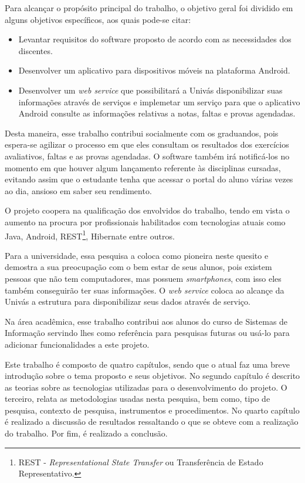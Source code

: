 	\par Para alcançar o propósito principal do trabalho, o objetivo geral foi
dividido em alguns objetivos específicos, aos quais pode-se citar:
	
	\begin{itemize}
	  
	  \item Levantar requisitos do software proposto de acordo com as
	  necessidades dos discentes.
	  
	  \item Desenvolver um aplicativo para dispositivos móveis na plataforma
	  Android.
	  
	  \item Desenvolver um \textit{web service} que possibilitará a Univás
	  disponibilizar suas informações através de serviços e implemetar um serviço
	  para que o aplicativo Android consulte as informações  relativas a notas,
	  faltas e provas agendadas.
	
	\end{itemize}
	
	\par Desta maneira, esse trabalho contribui socialmente com os graduandos, pois
espera-se agilizar o processo em que eles consultam os resultados dos
exercícios avaliativos, faltas e as provas agendadas. O software também irá
notificá-los no momento em que houver algum lançamento referente às disciplinas
cursadas, evitando assim que o estudante tenha que acessar o portal do aluno
várias vezes ao dia, ansioso em saber seu rendimento.

	\par O projeto coopera na qualificação dos envolvidos do trabalho, tendo em
vista o aumento na procura por profissionais habilitados com tecnologias atuais
como Java, Android, REST\footnote{REST - \textit{Representational State
Transfer} ou Transferência de Estado Representativo.}, Hibernate entre outros.

	\par Para a universidade, essa pesquisa a coloca como pioneira neste quesito e
demostra a sua preocupação com o bem estar de seus alunos, pois existem pessoas
que não tem computadores, mas possuem \textit{smartphones}, com isso eles
também conseguirão ter suas informações. O \textit{web service} coloca ao
alcançe da Univás a estrutura para disponibilizar seus dados através de
serviço.

	\par Na área acadêmica, esse trabalho contribui aos alunos do curso de Sistemas
de Informação servindo lhes como referência para pesquisas futuras ou usá-lo
para adicionar funcionalidades a este projeto.

	\par Este trabalho é composto de quatro capítulos, sendo que o atual faz uma
breve introdução sobre o tema proposto e seus objetivos. No segundo capítulo é
descrito as teorias sobre as tecnologias utilizadas para o desenvolvimento do
projeto. O terceiro, relata as metodologias usadas nesta pesquisa, bem como,
tipo de pesquisa, contexto de pesquisa, instrumentos e procedimentos. No quarto
capítulo é realizado a discussão de resultados ressaltando o que se obteve com
a realização do trabalho. Por fim, é realizado a conclusão.
